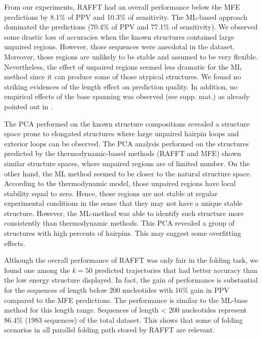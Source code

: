 \documentclass[a4paper,12pt]{article}
\begin{document}
From our experiments, RAFFT had an overall performance below the MFE predictions
by 8.1\% of PPV and 10.3\% of sensitivity. The ML-based approach dominated the
predictions (70.4\% of PPV and 77.1\% of sensitivity). We observed some drastic
loss of accuracies when the known structures contained large unpaired regions.
However, those sequences were anecdotal in the dataset. Moreover, those regions
are unlikely to be stable and assumed to be very flexible. Nevertheless, the
effect of unpaired regions seemed less dramatic for the ML method since it can
produce some of those atypical structures. We found no striking evidences of the
length effect on prediction quality. In addition, no empirical effects of the
base spanning was observed (see supp. mat.) as already pointed out in
\cite{amman13_troub_long_range_base_pairs_rna_foldin}.

The PCA performed on the known structure compositions revealed a structure space
prone to elongated structures where large unpaired hairpin loops and exterior
loops can be observed. The PCA analysis performed on the structures predicted by
the thermodynamic-based methods (RAFFT and MFE) shown similar structure spaces,
where unpaired regions are of limited number. On the other hand, the ML method
seemed to be closer to the natural structure space. According to the
thermodynamic model, those unpaired regions have local stability equal to zero.
Hence, those regions are not stable at regular experimental conditions in the
sense that they may not have a unique stable structure. However, the ML-method
was able to identify such structure more consistently than thermodynamic
methods. This PCA revealed a group of structures with high percents of hairpins.
This may suggest some overfitting effects.

Although the overall performance of RAFFT was only fair in the folding task, we
found one among the \(k=50\) predicted trajectories that had better accuracy than
the low energy structure displayed. In fact, the gain of performance is
substantial for the sequences of length below 200 nucleotides with 16\% gain in
PPV compared to the MFE predictions. The performance is similar to the ML-base
method for this length range. Sequences of length \textless{} 200 nucleotides represent
86.4\% (1983 sequences) of the total dataset. This shows that some of folding
scenarios in all parallel folding path stored by RAFFT are relevant.
\end{document}
